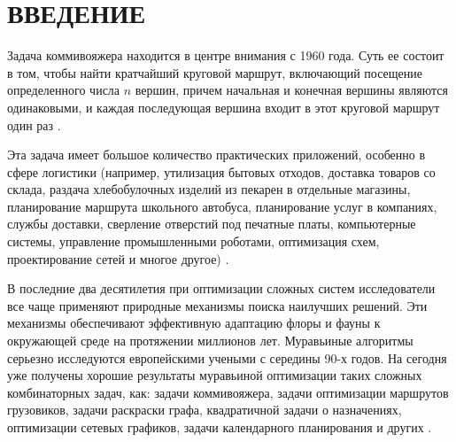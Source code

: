 {\centering \chapter*{ВВЕДЕНИЕ}}
 
Задача коммивояжера находится в центре внимания с 1960 года. 
Суть ее состоит в том, чтобы найти кратчайший круговой маршрут, включающий посещение определенного числа $n$ вершин, причем начальная и конечная вершины являются одинаковыми, и каждая последующая вершина входит в этот круговой маршрут один раз \cite{Brezina2020}. 

Эта задача имеет большое количество практических приложений, особенно в сфере логистики (например, утилизация бытовых отходов, доставка товаров со склада, раздача хлебобулочных изделий из пекарен в отдельные магазины, планирование маршрута школьного автобуса, планирование услуг в компаниях, службы доставки, сверление отверстий под печатные платы, компьютерные системы, управление промышленными роботами, оптимизация схем, проектирование сетей и многое другое) \cite{Brezina2020}.

В последние два десятилетия при оптимизации сложных систем исследователи все чаще применяют природные механизмы поиска наилучших решений. 
Эти механизмы обеспечивают эффективную адаптацию флоры и фауны к окружающей среде на протяжении миллионов лет. 
Муравьиные алгоритмы серьезно исследуются европейскими учеными с середины 90-х годов. 
На сегодня уже получены хорошие результаты муравьиной оптимизации таких сложных комбинаторных задач, как: задачи коммивояжера, задачи оптимизации маршрутов грузовиков, задачи раскраски графа, квадратичной задачи о назначениях, оптимизации сетевых графиков, задачи календарного планирования и других \cite{Shtovba2003}. 
